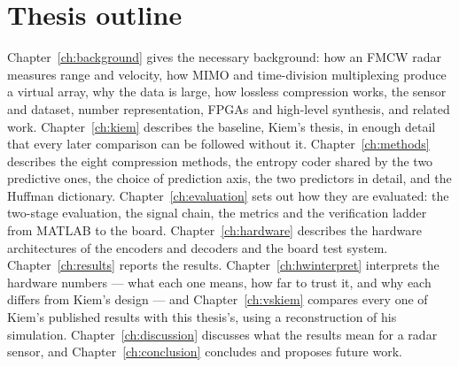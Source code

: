 \section{Thesis outline}
\label{sec:structure}

Chapter~\ref{ch:background} gives the necessary background: how an FMCW radar
measures range and velocity, how MIMO and time-division multiplexing produce a
virtual array, why the data is large, how lossless compression works, the
sensor and dataset, number representation, FPGAs and high-level synthesis, and
related work. Chapter~\ref{ch:kiem} describes the baseline, Kiem's thesis, in
enough detail that every later comparison can be followed without it.
Chapter~\ref{ch:methods} describes the eight compression methods, the entropy
coder shared by the two predictive ones, the choice of prediction axis, the two
predictors in detail, and the Huffman dictionary. Chapter~\ref{ch:evaluation}
sets out how they are evaluated: the two-stage evaluation, the signal chain, the
metrics and the verification ladder from MATLAB to the board.
Chapter~\ref{ch:hardware} describes the hardware architectures of the encoders
and decoders and the board test system. Chapter~\ref{ch:results} reports the
results. Chapter~\ref{ch:hwinterpret} interprets the hardware numbers --- what
each one means, how far to trust it, and why each differs from Kiem's design ---
and Chapter~\ref{ch:vskiem} compares every one of Kiem's published results with
this thesis's, using a reconstruction of his simulation.
Chapter~\ref{ch:discussion} discusses what the results mean for a radar sensor,
and Chapter~\ref{ch:conclusion} concludes and proposes future work.
